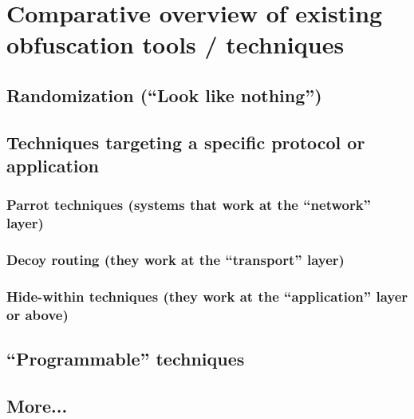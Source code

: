 %
\section{Comparative overview of existing obfuscation tools / techniques}
\label{section:comparison} 

\subsection{Randomization (``Look like nothing'')}
\subsection{Techniques targeting a specific protocol or application}
	\subsubsection{Parrot techniques (systems that work at the ``network'' layer)}
	\subsubsection{Decoy routing (they work at the ``transport'' layer)}
	\subsubsection{Hide-within techniques (they work at the ``application'' layer or above)}
\subsection{``Programmable'' techniques}
\subsection{More...}

